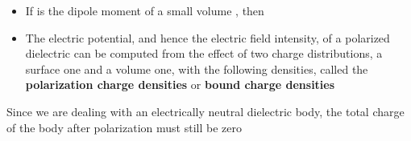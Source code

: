 \begin{ELunit}

\begin{itemize}
\tightlist
\item
  If  is the dipole moment of a small volume , then
\end{itemize}


\begin{itemize}
\tightlist
\item
  The electric potential, and hence the electric field intensity, of a polarized dielectric can be computed from the effect of two charge distributions, a surface one and a volume one, with the following densities, called the \textbf{polarization charge densities} or \textbf{bound charge densities}
\end{itemize}

\end{ELunit}

\begin{ELimportant}{}


\end{ELimportant}

\begin{ELremark}{}

Since we are dealing with an electrically neutral dielectric body, the total charge of the body after polarization must still be zero

\end{ELremark}

\ELhold


